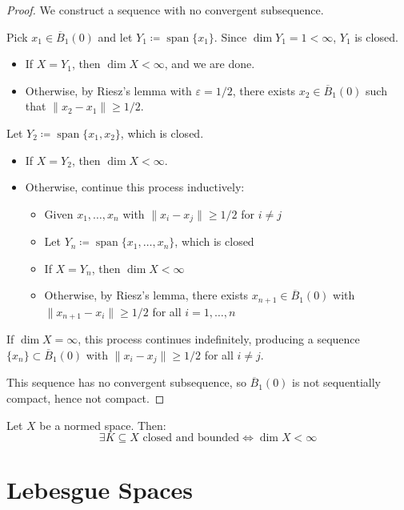 \begin{proof}
We construct a sequence with no convergent subsequence.

Pick \( x_1 \in \overline{B}_1(0) \) and let \( Y_1 \coloneqq \operatorname{span}\{x_1\} \). Since \( \dim Y_1 = 1 < \infty \), \( Y_1 \) is closed.
\begin{itemize}
    \item If \( X = Y_1 \), then \( \dim X < \infty \), and we are done.
    
    \item Otherwise, by Riesz's lemma with \( \varepsilon = 1/2 \), there exists \( x_2 \in \overline{B}_1(0) \) such that \( \|x_2 - x_1\| \geq 1/2 \).
\end{itemize}
Let \( Y_2 \coloneqq \operatorname{span}\{x_1, x_2\} \), which is closed.
\begin{itemize}
    \item If \( X = Y_2 \), then \( \dim X < \infty \).
    
    \item Otherwise, continue this process inductively:
    \begin{itemize}
        \item Given \( x_1, \dots, x_n \) with \( \|x_i - x_j\| \geq 1/2 \) for \( i \neq j \)
        \item Let \( Y_n \coloneqq \operatorname{span}\{x_1, \dots, x_n\} \), which is closed
        \item If \( X = Y_n \), then \( \dim X < \infty \)
        \item Otherwise, by Riesz's lemma, there exists \( x_{n+1} \in \overline{B}_1(0) \) with \( \|x_{n+1} - x_i\| \geq 1/2 \) for all \( i = 1, \dots, n \)
    \end{itemize}
\end{itemize}
If \( \dim X = \infty \), this process continues indefinitely, producing a sequence \( \{x_n\} \subset \overline{B}_1(0) \) with \( \|x_i - x_j\| \geq 1/2 \) for all \( i \neq j \).

This sequence has no convergent subsequence, so \( \overline{B}_1(0) \) is not sequentially compact, hence not compact.
\end{proof}

\begin{corollary}
Let \( X \) be a normed space. Then:
\[
\exists K \subseteq X \text{ closed and bounded} \iff \dim X < \infty
\]
\end{corollary}

\clearpage
\section{Lebesgue Spaces}
